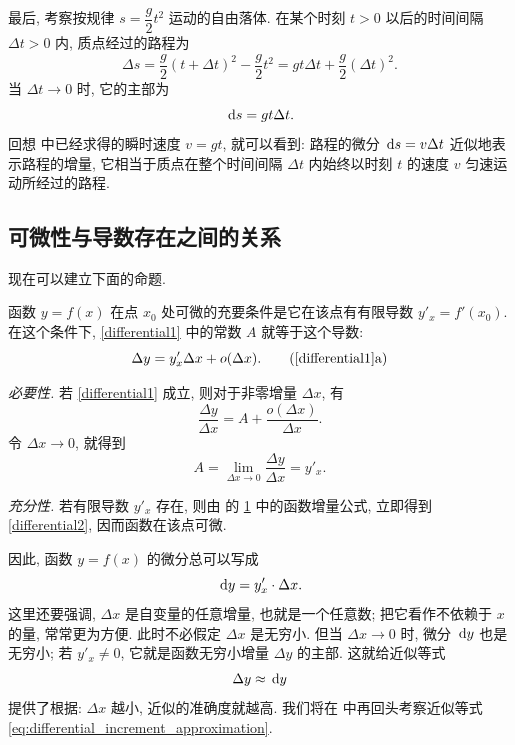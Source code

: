 \label{ex:differential_free_fall}
最后, 考察按规律 $s=\dfrac g2t^2$ 运动的自由落体.
在某个时刻 $t>0$ 以后的时间间隔 $\Delta t>0$ 内, 质点经过的路程为
$$
\Delta s=\frac g2(t+\Delta t)^2-\frac g2t^2
=gt\Delta t+\frac g2(\Delta t)^2.
$$
当 $\Delta t\to0$ 时, 它的主部为
$$
\,\mathrm{d} s=gt\Delta t.
$$
回想  中已经求得的瞬时速度 $v=gt$, 就可以看到:
路程的微分 $\,\mathrm{d} s=v\Delta t$ 近似地表示路程的增量,
它相当于质点在整个时间间隔 $\Delta t$ 内始终以时刻 $t$ 的速度 $v$ 匀速运动所经过的路程.

\subsection{可微性与导数存在之间的关系}\label{subsec:104}
现在可以建立下面的命题.

\label{thm:differentiability_derivative_equivalence}
{\kaishu 函数 $y=f(x)$ 在点 $x_0$ 处可微的充要条件是它在该点有有限导数 $y'_x=f'(x_0)$.
在这个条件下, \eqref{differential1} 中的常数 $A$ 就等于这个导数:}
\begin{equation}\label{differential2}
\Delta y=y'_x\Delta x+o(\Delta x).\tag{\ref{differential1}a}
\end{equation}

\emph{必要性.} 若 \eqref{differential1} 成立, 则对于非零增量 $\Delta x$, 有
$$
\frac{\Delta y}{\Delta x}=A+\frac{o(\Delta x)}{\Delta x}.
$$
令 $\Delta x\to0$, 就得到
$$
A=\lim_{\Delta x\to0}\frac{\Delta y}{\Delta x}=y'_x.
$$

\emph{充分性.} 若有限导数 $y'_x$ 存在, 则由  的
\hyperref[prop:function_increment_expansion]{1\textdegree} 中的函数增量公式,
立即得到 \eqref{differential2}, 因而函数在该点可微.

因此, 函数 $y=f(x)$ 的微分总可以写成
\footnotemark
\begin{equation}\label{differential}
\,\mathrm{d} y=y'_x\cdot\Delta x.
\end{equation}
这里还要强调, $\Delta x$ 是自变量的任意增量, 也就是一个任意数;
把它看作不依赖于 $x$ 的量, 常常更为方便.
此时不必假定 $\Delta x$ 是无穷小.
但当 $\Delta x\to0$ 时, 微分 $\,\mathrm{d} y$ 也是无穷小;
若 $y'_x\neq0$, 它就是函数无穷小增量 $\Delta y$ 的主部.
这就给近似等式
\begin{equation}\label{eq:differential_increment_approximation}
\Delta y\approx\,\mathrm{d} y
\end{equation}
提供了根据: $\Delta x$ 越小, 近似的准确度就越高.
我们将在  中再回头考察近似等式 \eqref{eq:differential_increment_approximation}.

